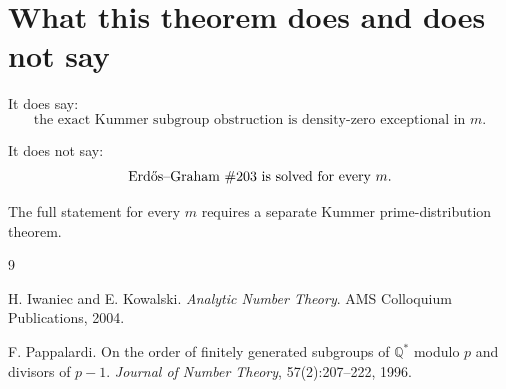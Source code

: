 \documentclass[11pt]{article}
\newcommand{\1}{\mathbf 1}
\begin{document}
\section{What this theorem does and does not say}

It does say:
\[
\text{the exact Kummer subgroup obstruction is density-zero exceptional in }m.
\]

It does not say:
\[
\text{Erd\H{o}s--Graham \#203 is solved for every }m.
\]

The full statement for every \(m\) requires a separate Kummer prime-distribution theorem.


\begin{thebibliography}{9}

H. Iwaniec and E. Kowalski.
\newblock \emph{Analytic Number Theory}.
\newblock AMS Colloquium Publications, 2004.

F. Pappalardi.
\newblock On the order of finitely generated subgroups of \(\mathbb Q^*\) modulo \(p\) and divisors of \(p-1\).
\newblock \emph{Journal of Number Theory}, 57(2):207--222, 1996.

\end{thebibliography}
\end{document}
